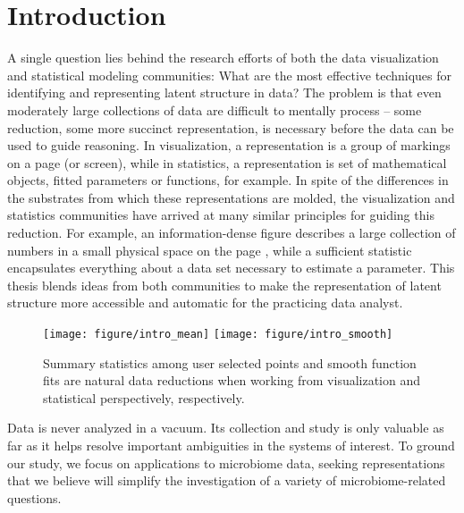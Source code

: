 \chapter{Introduction}
\label{ch:introduction}

A single question lies behind the research efforts of both the data
visualization and statistical modeling communities: What are the most effective
techniques for identifying and representing latent structure in data? The
problem is that even moderately large collections of data are difficult to
mentally process -- some reduction, some more succinct representation, is
necessary before the data can be used to guide reasoning. In visualization, a
representation is a group of markings on a page (or screen), while in
statistics, a representation is set of mathematical objects, fitted parameters
or functions, for example. In spite of the differences in the substrates from
which these representations are molded, the visualization and statistics
communities have arrived at many similar principles for guiding this reduction.
For example, an information-dense figure describes a large collection of numbers
in a small physical space on the page \citep{tufte2014visual}, while a
sufficient statistic encapsulates everything about a data set necessary to
estimate a parameter. This thesis blends ideas from both communities to make the
representation of latent structure more accessible and automatic for the
practicing data analyst.

\begin{figure}
  \texttt{[image: figure/intro\_mean]}
  \texttt{[image: figure/intro\_smooth]}
  \caption{Summary statistics among user selected points and smooth function
    fits are natural data reductions when working from visualization and
    statistical perspectively, respectively.}
\end{figure}

Data is never analyzed in a vacuum. Its collection and study is only valuable
as far as it helps resolve important ambiguities in the systems of interest. To
ground our study, we focus on applications to microbiome data, seeking
representations that we believe will simplify the investigation of a variety of
microbiome-related questions.

